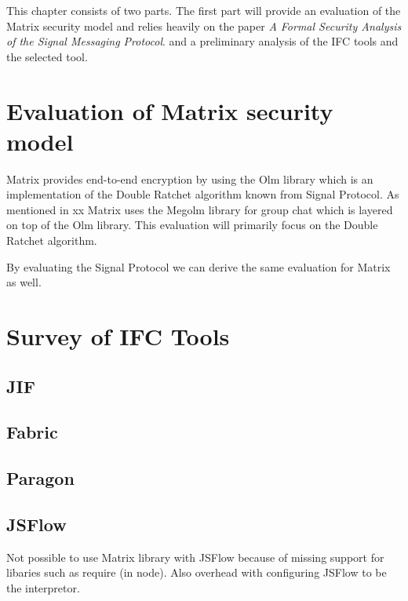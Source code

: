 This chapter consists of two parts. The first part will provide an evaluation of the Matrix security model and relies heavily on the paper \emph{A Formal Security Analysis of the Signal Messaging Protocol}. 
  and a preliminary analysis of the IFC tools and the selected tool. 


\section{Evaluation of Matrix security model}

Matrix provides end-to-end encryption by using the Olm library which is an implementation of the Double Ratchet algorithm known from Signal Protocol. As mentioned in xx Matrix uses the Megolm library for group chat which is layered on top of the Olm library. This evaluation will primarily focus on the Double Ratchet algorithm. 

By evaluating the Signal Protocol we can derive the same evaluation for Matrix as well.  





\section{Survey of IFC Tools}

\subsection{JIF}

\subsection{Fabric}

\subsection{Paragon}

\subsection{JSFlow}
Not possible to use Matrix library with JSFlow because of missing support for libaries such as require (in node). Also overhead with configuring JSFlow to be the interpretor.


